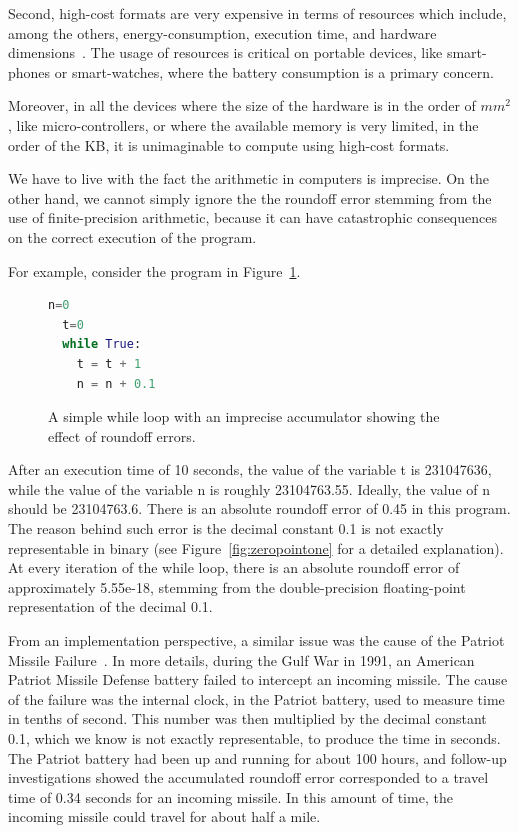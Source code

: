 Second, high-cost formats are very expensive in terms of resources which include, among the others, energy-consumption, execution time, and hardware dimensions~\cite{fppower, lutnet}. 
%
The usage of resources is critical on portable devices, like smart-phones or smart-watches, where the battery consumption is a primary concern.
%

Moreover, in all the devices where the size of the hardware is in the order of $mm^{2}$, like micro-controllers, or where the available memory is very limited, in the order of the KB, it is unimaginable to compute using high-cost formats.
%

We have to live with the fact the arithmetic in computers is imprecise.
%
On the other hand, we cannot simply ignore the the roundoff error stemming from the use of finite-precision arithmetic, because it can have catastrophic consequences on the correct execution of the program.
%

For example, consider the program in Figure~\ref{fig:while}.
%
\begin{figure}[tb!]
	\begin{lstlisting}[frame=single, language=Python]
  n=0
  t=0
  while True:
    t = t + 1
    n = n + 0.1
	\end{lstlisting}
	\caption{A simple while loop with an imprecise accumulator showing the effect of roundoff errors.}\label{fig:while}
\end{figure}
%
After an execution time of 10 seconds, the value of the variable t is 231047636, while the value of the variable n is roughly 23104763.55.
%
Ideally, the value of n should be 23104763.6.
%
There is an absolute roundoff error of 0.45 in this program.
%
The reason behind such error is the decimal constant 0.1 is not exactly representable in binary (see Figure~\ref{fig:zeropointone} for a detailed explanation). 
%
At every iteration of the while loop, there is an absolute roundoff error of approximately 5.55e-18, stemming from the double-precision floating-point representation of the decimal 0.1. 
%

From an implementation perspective, a similar issue was the cause of the Patriot Missile Failure~\cite{patriot}.
%
In more details, during the Gulf War in 1991, an American Patriot Missile Defense battery failed to intercept an incoming missile.
%
The cause of the failure was the internal clock, in the Patriot battery, used to measure time in tenths of second.
%
This number was then multiplied by the decimal constant 0.1, which we know is not exactly representable, to produce the time in seconds.
%
The Patriot battery had been up and running for about 100 hours, and follow-up investigations showed the accumulated roundoff error corresponded to a travel time of 0.34 seconds for an incoming missile. 
%
In this amount of time, the incoming missile could travel for about half a mile.

